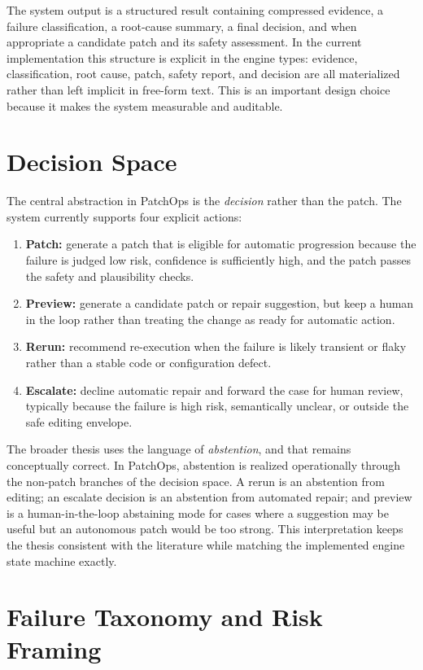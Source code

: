 The system output is a structured result containing compressed evidence, a failure classification, a root-cause
summary, a final decision, and when appropriate a candidate patch and its safety assessment. In the current
implementation this structure is explicit in the engine types: evidence, classification, root cause, patch,
safety report, and decision are all materialized rather than left implicit in free-form text. This is an
important design choice because it makes the system measurable and auditable.

\section{Decision Space}

The central abstraction in PatchOps is the \emph{decision} rather than the patch. The system currently supports
four explicit actions:

\begin{enumerate}
\item \textbf{Patch:} generate a patch that is eligible for automatic progression because the failure is judged
low risk, confidence is sufficiently high, and the patch passes the safety and plausibility checks.
\item \textbf{Preview:} generate a candidate patch or repair suggestion, but keep a human in the loop rather
than treating the change as ready for automatic action.
\item \textbf{Rerun:} recommend re-execution when the failure is likely transient or flaky rather than a stable
code or configuration defect.
\item \textbf{Escalate:} decline automatic repair and forward the case for human review, typically because the
failure is high risk, semantically unclear, or outside the safe editing envelope.
\end{enumerate}

The broader thesis uses the language of \emph{abstention}, and that remains conceptually correct. In PatchOps,
abstention is realized operationally through the non-patch branches of the decision space. A rerun is an
abstention from editing; an escalate decision is an abstention from automated repair; and preview is a
human-in-the-loop abstaining mode for cases where a suggestion may be useful but an autonomous patch would be
too strong. This interpretation keeps the thesis consistent with the literature while matching the implemented
engine state machine exactly.

\section{Failure Taxonomy and Risk Framing}

